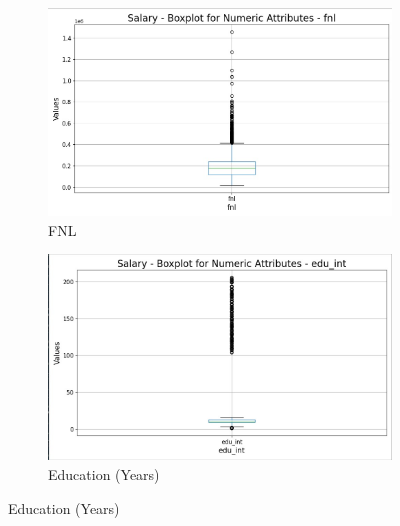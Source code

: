 \documentclass[a4paper,12pt]{article}
\begin{document}
\begin{figure}[h!]
    \centering
    \begin{subfigure}[b]{0.45\textwidth}
        \centering
        \includegraphics[width=\textwidth]{Resources/Boxplot_fnl.jpeg}
        \caption{FNL}
        \label{fig:fnl}
    \end{subfigure}
    \hfill
    \begin{subfigure}[b]{0.45\textwidth}
        \centering
        \includegraphics[width=\textwidth]{Resources/Boxplot_edu_int.jpeg}
        \caption{Education (Years)}
        \label{fig:edu_int}
    \end{subfigure}
    
    \vspace{0.5cm}
    

\end{figure}
\end{document}

